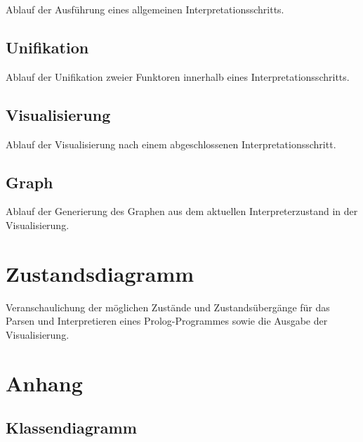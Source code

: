 \documentclass[parskip=full,11pt,twoside]{scrartcl}
\begin{document}
Ablauf der Ausführung eines allgemeinen Interpretationsschritts.

\subsection{Unifikation}

Ablauf der Unifikation zweier Funktoren innerhalb eines Interpretationsschritts.

\subsection{Visualisierung}

Ablauf der Visualisierung nach einem abgeschlossenen Interpretationsschritt. 

\subsection{Graph}

Ablauf der Generierung des Graphen aus dem aktuellen Interpreterzustand in der Visualisierung.

\section{Zustandsdiagramm}

Veranschaulichung der möglichen Zustände und Zustandsübergänge für das Parsen und Interpretieren eines Prolog-Programmes sowie die Ausgabe der Visualisierung.

\appendix

\section{Anhang}

\subsection{Klassendiagramm}
\end{document}
